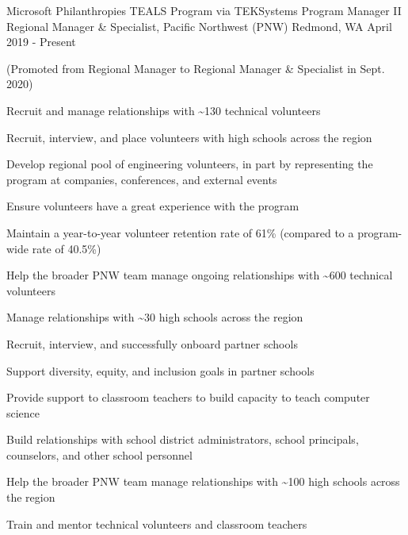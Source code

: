 \begin{cventries}

  \cventry
{Microsoft Philanthropies TEALS Program via TEKSystems}
    {Program Manager II
	\newline Regional Manager \& Specialist, Pacific Northwest (PNW)}
    {Redmond, WA}
    {April 2019 - Present}
    {(Promoted from Regional Manager to Regional Manager \& Specialist in Sept. 2020)\vspace{4mm}
      \begin{cvitems}
	\item Recruit and manage relationships with \~{}130 technical volunteers\\
	\begin{cvitems}
		\item Recruit, interview, and place volunteers with high schools across the region
		\item Develop regional pool of engineering volunteers, in part by representing the program at companies, conferences, and external events
		\item Ensure volunteers have a great experience with the program
		\item Maintain a year-to-year volunteer retention rate of 61\% (compared to a program-wide rate of 40.5\%)
		\item Help the broader PNW team manage ongoing relationships with \~{}600 technical volunteers
	\end{cvitems}
	\vspace{2mm}
	\item Manage relationships with \~{}30 high schools across the region\\
		\begin{cvitems}
		\item Recruit, interview, and successfully onboard partner schools
		\item Support diversity, equity, and inclusion goals in partner schools
		\item Provide support to classroom teachers to build capacity to teach computer science 
		\item Build relationships with school district administrators, school principals, counselors, and other school personnel
		\item Help the broader PNW team manage relationships with \~{}100 high schools across the region
	\end{cvitems}
	\vspace{2mm}
	\item Train and mentor technical volunteers and classroom teachers\\

\end{cvitems}}
\end{cventries}
